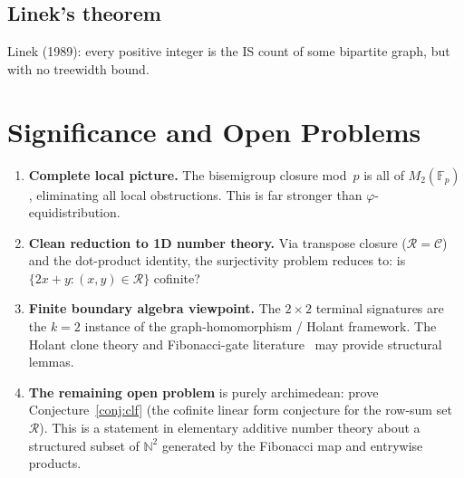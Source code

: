 \documentclass[11pt,a4paper]{article}
\theoremstyle{definition}
\theoremstyle{remark}
\newcommand{\FF}{\mathbb{F}}
\newcommand{\NN}{\mathbb{N}}
\newcommand{\cR}{\mathcal{R}}
\newcommand{\cC}{\mathcal{C}}
\begin{document}
\subsection{Linek's theorem}

Linek (1989): every positive integer is the IS count of some bipartite graph, but with no treewidth bound.

\section{Significance and Open Problems}

\begin{enumerate}
  \item \textbf{Complete local picture.} The bisemigroup closure mod~$p$ is all of $M_2(\FF_p)$, eliminating all local obstructions. This is far stronger than $\varphi$-equidistribution.

  \item \textbf{Clean reduction to 1D number theory.} Via transpose closure ($\cR = \cC$) and the dot-product identity, the surjectivity problem reduces to: is $\{2x + y : (x, y) \in \cR\}$ cofinite?

  \item \textbf{Finite boundary algebra viewpoint.} The $2 \times 2$ terminal signatures are the $k = 2$ instance of the graph-homomorphism / Holant framework. The Holant clone theory and Fibonacci-gate literature~\cite{arXiv:1811.00817} may provide structural lemmas.

  \item \textbf{The remaining open problem} is purely archimedean: prove Conjecture~\ref{conj:clf} (the cofinite linear form conjecture for the row-sum set $\cR$). This is a statement in elementary additive number theory about a structured subset of $\NN^2$ generated by the Fibonacci map and entrywise products.
\end{enumerate}
\end{document}
